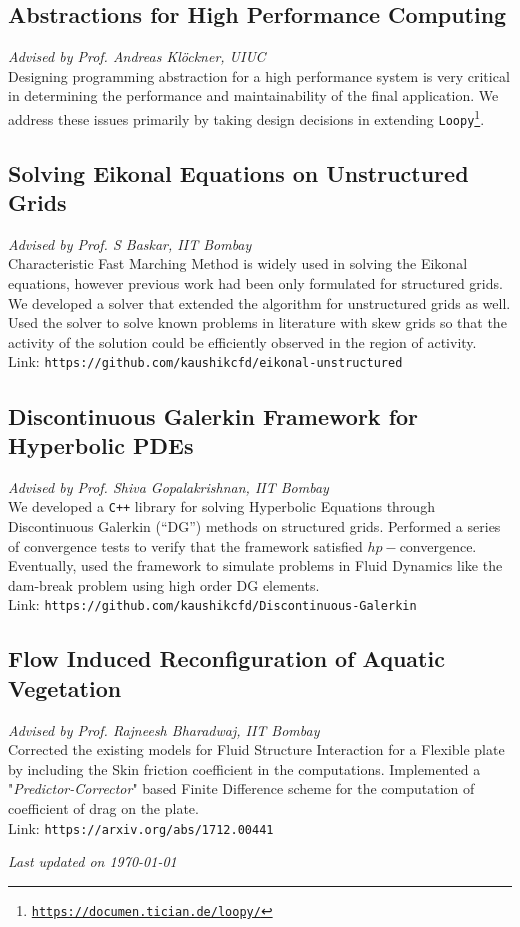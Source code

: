 \documentclass[letterpaper, 13pt]{article}
\newcommand{\updatenote}[1][\today]{\par\vfill{\scriptsize \textit{Last updated on #1}}}
\begin{document}
\subsection*{Abstractions for High Performance Computing}
\vspace{-1ex}
\small \textit{Advised by Prof. Andreas Kl\"{o}ckner, UIUC}\\
Designing programming abstraction for a high performance system is very critical in determining the performance and maintainability of the final application.
We address these issues primarily by taking design decisions in extending \texttt{Loopy}\footnote{\texttt{\url{https://documen.tician.de/loopy/}}}.

\subsection*{Solving Eikonal Equations on Unstructured Grids}
\vspace{-1ex}
\small \textit{Advised by Prof. S Baskar, IIT Bombay}\\
Characteristic Fast Marching Method is widely used in solving the Eikonal
equations, however previous work had been only formulated for structured
grids. We developed a solver that extended the algorithm for
unstructured grids as well. Used the solver to solve known problems in
literature with skew grids so that the activity of the solution could be
efficiently observed in the region of activity.\\
Link: \texttt{https://github.com/kaushikcfd/eikonal-unstructured}


\subsection*{Discontinuous Galerkin Framework for Hyperbolic PDEs}
\vspace{-1ex}
\small \textit{Advised by Prof. Shiva Gopalakrishnan, IIT Bombay}\\
We developed a \texttt{C++} library for solving Hyperbolic Equations through Discontinuous Galerkin (``DG'') methods on structured grids.  Performed a series of convergence tests to verify that the framework satisfied $hp-$convergence.
Eventually, used the framework to simulate problems in Fluid Dynamics like the dam-break problem using high order DG elements.\\
Link: \texttt{https://github.com/kaushikcfd/Discontinuous-Galerkin}


\subsection*{Flow Induced Reconfiguration of Aquatic Vegetation}
\vspace{-1ex}
\small \textit{Advised by Prof. Rajneesh Bharadwaj, IIT Bombay}\\
Corrected the existing models for Fluid Structure Interaction for a Flexible plate by including the Skin friction coefficient in the computations.
Implemented a "\textit{Predictor-Corrector}" based Finite Difference scheme for the computation of coefficient of drag on the plate.\\
Link: \texttt{https://arxiv.org/abs/1712.00441}


\updatenote
\end{document}

